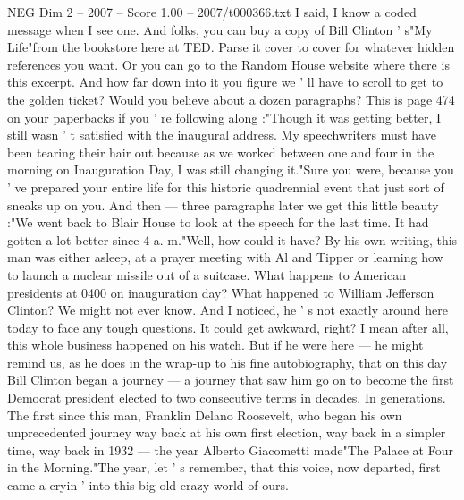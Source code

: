 \begin{textsample}{NEG Dim 2 – 2007 – Score 1.00 – 2007/t000366.txt}
I said, I know a coded message when I see one.
And folks, you can buy a copy of Bill Clinton ' s"My Life"from the bookstore here at TED.
Parse it cover to cover for whatever hidden references you want.
Or you can go to the Random House website where there is this excerpt.
And how far down into it you figure we ' ll have to scroll to get to the golden ticket?
Would you believe about a dozen paragraphs?
This is page 474 on your paperbacks if you ' re following along :"Though it was getting better, I still wasn ' t satisfied with the inaugural address.
My speechwriters must have been tearing their hair out because as we worked between one and four in the morning on Inauguration Day, I was still changing it."Sure you were, because you ' ve prepared your entire life for this historic quadrennial event that just sort of sneaks up on you.
And then — three paragraphs later we get this little beauty :"We went back to Blair House to look at the speech for the last time.
It had gotten a lot better since 4 a. m."Well, how could it have?
By his own writing, this man was either asleep, at a prayer meeting with Al and Tipper or learning how to launch a nuclear missile out of a suitcase.
What happens to American presidents at 0400 on inauguration day?
What happened to William Jefferson Clinton?
We might not ever know.
And I noticed, he ' s not exactly around here today to face any tough questions.
It could get awkward, right?
I mean after all, this whole business happened on his watch.
But if he were here — he might remind us, as he does in the wrap-up to his fine autobiography, that on this day Bill Clinton began a journey — a journey that saw him go on to become the first Democrat president elected to two consecutive terms in decades.
In generations.
The first since this man, Franklin Delano Roosevelt, who began his own unprecedented journey way back at his own first election, way back in a simpler time, way back in 1932 — the year Alberto Giacometti made"The Palace at Four in the Morning."The year, let ' s remember, that this voice, now departed, first came a-cryin ' into this big old crazy world of ours.

\end{textsample}
